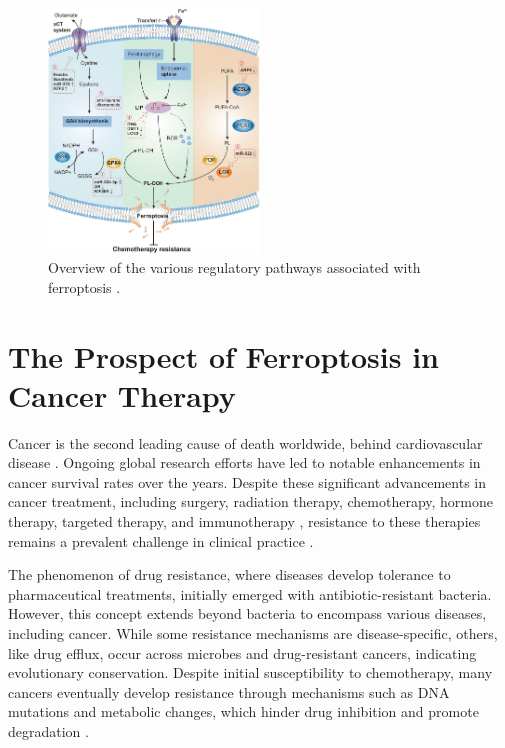\begin{figure}[ht]
	\begin{center}
		\includegraphics[width = 0.5\textwidth]{Fig/ferroptosis.png}
		\end{center}
		\caption{Overview of the various regulatory pathways associated with ferroptosis \citep{ferro_cancer}.}\label{fig:ferro_mech}
\end{figure}

\section{The Prospect of Ferroptosis in Cancer Therapy}

Cancer is the second leading cause of death worldwide, behind cardiovascular disease \citep{cancer}. Ongoing global research efforts have led to notable enhancements in cancer survival rates over the years. Despite these significant advancements in cancer treatment, including surgery, radiation therapy, chemotherapy, hormone therapy, targeted therapy, and immunotherapy \citep{therapies}, resistance to these therapies remains a prevalent challenge in clinical practice \citep{therapy_resistance}.

The phenomenon of drug resistance, where diseases develop tolerance to pharmaceutical treatments, initially emerged with antibiotic-resistant bacteria. However, this concept extends beyond bacteria to encompass various diseases, including cancer. While some resistance mechanisms are disease-specific, others, like drug efflux, occur across microbes and drug-resistant cancers, indicating evolutionary conservation. Despite initial susceptibility to chemotherapy, many cancers eventually develop resistance through mechanisms such as DNA mutations and metabolic changes, which hinder drug inhibition and promote degradation \citep{therapy_resistance2}.


